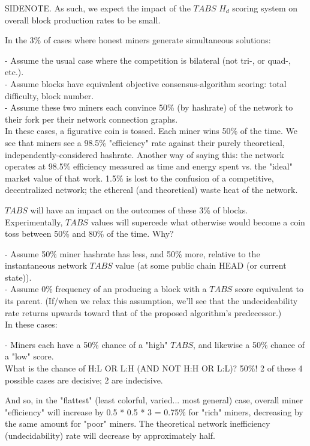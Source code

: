 \documentclass[11pt]{article}
\theoremstyle{plain}
\begin{document}
{SIDENOTE. As such, we expect the impact of the $TABS$ \times $H_{d}$ scoring
system on overall block production rates to be small.

In the 3\% of cases where honest miners generate simultaneous solutions:

- Assume the usual case where the competition is bilateral (not tri-, or quad-,
etc.). \\
- Assume blocks have equivalent objective consensus-algorithm scoring: total
difficulty, block number. \\
- Assume these two miners each convince 50\% (by hashrate) of the network to
their fork per their network connection graphs. \\

In these cases, a figurative coin is tossed. Each miner wins 50\% of the time.
We see that miners see a 98.5\% "efficiency" rate against their purely
theoretical, independently-considered hashrate.
Another way of saying this: the network operates at 98.5\% efficiency measured
as time and energy spent vs. the "ideal" market value of that work.
1.5\% is lost to the confusion of a competitive, decentralized network; the
ethereal (and theoretical) waste heat of the network.

$TABS$ will have an impact on the outcomes of these 3\% of blocks.
Experimentally, $TABS$ values will supercede what otherwise would become a coin
toss between 50\% and 80\% of the time.
Why?

- Assume 50\% miner hashrate has less, and 50\% more, relative to the
instantaneous network $TABS$ value (at some public chain HEAD (or current
state)). \\
- Assume 0\% frequency of an producing a block with a $TABS$ score equivalent
to its parent. (If/when we relax this assumption, we'll see that the
undecideability rate returns upwards toward that of the proposed algorithm's
predecessor.) \\

In these cases:

- Miners each have a 50\% chance of a "high" $TABS$, and likewise a 50\% chance
of a "low" score. \\

What is the chance of H:L OR L:H (AND NOT H:H OR L:L)? 50\%! 2 of these 4
possible cases are decisive; 2 are indecisive.

And so, in the "flattest" (least colorful, varied... most general) case,
overall miner "efficiency" will increase by 0.5 * 0.5 * 3 = 0.75\% for "rich"
miners, decreasing by the same amount for "poor" miners.
The theoretical network inefficiency (undecidability) rate will decrease by
approximately half.


}
\end{document}
